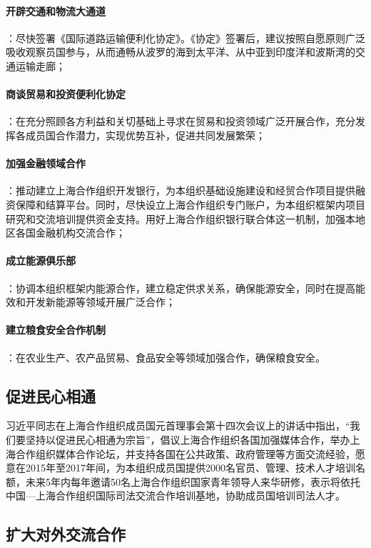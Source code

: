 \documentclass[12pt,titlepage]{ctexart}
\begin{document}
    \paragraph{开辟交通和物流大通道}：尽快签署《国际道路运输便利化协定》。《协定》签署后，建议按照自愿原则广泛吸收观察员国参与，从而通畅从波罗的海到太平洋、从中亚到印度洋和波斯湾的交通运输走廊；

    \paragraph{商谈贸易和投资便利化协定}：在充分照顾各方利益和关切基础上寻求在贸易和投资领域广泛开展合作，充分发挥各成员国合作潜力，实现优势互补，促进共同发展繁荣；

    \paragraph{加强金融领域合作}：推动建立上海合作组织开发银行，为本组织基础设施建设和经贸合作项目提供融资保障和结算平台。同时，尽快设立上海合作组织专门账户，为本组织框架内项目研究和交流培训提供资金支持。用好上海合作组织银行联合体这一机制，加强本地区各国金融机构交流合作；

    \paragraph{成立能源俱乐部}：协调本组织框架内能源合作，建立稳定供求关系，确保能源安全，同时在提高能效和开发新能源等领域开展广泛合作；

    \paragraph{建立粮食安全合作机制}：在农业生产、农产品贸易、食品安全等领域加强合作，确保粮食安全。
    
    \subsection{促进民心相通}

    习近平同志在上海合作组织成员国元首理事会第十四次会议上的讲话中指出，``我们要坚持以促进民心相通为宗旨''，倡议上海合作组织各国加强媒体合作，举办上海合作组织媒体合作论坛，并支持各国在公共政策、政府管理等方面交流经验，愿意在2015年至2017年间，为本组织成员国提供2000名官员、管理、技术人才培训名额，未来5年内每年邀请50名上海合作组织国家青年领导人来华研修，表示将依托中国—上海合作组织国际司法交流合作培训基地，协助成员国培训司法人才\cite{xi-2014}。

    \subsection{扩大对外交流合作}
\end{document}
